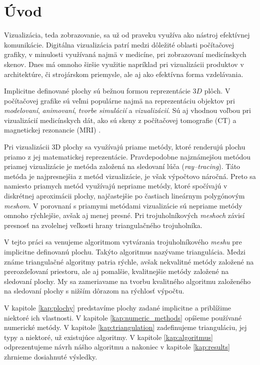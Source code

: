 \chapter*{Úvod} %

Vizualizácia, teda zobrazovanie, sa už od praveku využíva ako nástroj efektívnej komunikácie.
Digitálna vizualizácia patrí medzi dôležité oblasti počítačovej grafiky, 
v minulosti využívaná najmä v medicíne, pri zobrazovaní medicínskych skenov.
Dnes má omnoho širšie využitie napríklad pri vizualizácii produktov v architektúre, 
či strojárskom priemysle, ale aj ako efektívna forma vzdelávania. 

Implicitne definované plochy sú bežnou formou reprezentácie $3D$ plôch. V počítačovej grafike 
sú veľmi populárne najmä na reprezentáciu objektov pri \textit{modelovaní}, \textit{animovaní}, 
\textit{tvorbe simulácií} a \textit{vizualizácií}. Sú aj vhodnou
voľbou pri vizualizácií medicínskych dát, ako sú skeny z počítačovej tomografie (CT) a magnetickej
rezonancie (MRI) \cite{de2015survey}.

Pri vizualizácii 3D plochy sa využívajú priame metódy, ktoré renderujú plochu 
priamo z jej matematickej reprezentácie. Pravdepodobne najznámejšou metódou priamej vizualizácie je 
metóda založená na sledovaní lúča (\textit{ray--tracing}). Táto metóda je najpresnejšia z metód vizualizácie,
je však výpočtovo náročná. Preto sa namiesto priamych metód využívajú nepriame metódy, 
ktoré spočívajú v diskrétnej aproximácii plochy, najčastejšie po častiach lineárnym 
polygónovým \textit{meshom}. V porovnaní s priamymi metódami 
vizualizácie sú nepriame metódy omnoho rýchlejšie, avšak aj menej presné. Pri trojuholníkových 
\textit{meshoch} závisí presnosť na zvolelnej veľkosti hrany triangulačného trojuholníka. 

V tejto práci sa venujeme algoritmom vytvárania trojuholníkového \textit{meshu} pre 
implicitne definovanú plochu. Takýto algoritmus nazývame triangulácia. Medzi známe triangulačné 
algoritmy patria rýchle, avšak nekvalitné metódy založené na prerozdeľovaní priestoru, 
ale aj pomalšie, kvalitnejšie metódy založené na sledovaní plochy.
My sa zameriavame na tvorbu kvalitného algoritmu založeného na sledovaní plochy
s nižším dôrazom na rýchlosť výpočtu.

V kapitole \ref{kap:plochy} predstavíme plochy zadané implicitne a priblížime niektoré ich vlastnosti.
V kapitole \ref{kap:numeric_methods} opíšeme používané numerické metódy.
V kapitole \ref{kap:triangulation} zadefinujeme trianguláciu, jej typy a niektoré, už existujúce algoritmy.
V kapitole \ref{kap:algoritmus} odprezentujeme návrh nášho algoritmu a nakoniec v 
kapitole \ref{kap:results} zhrnieme dosiahnuté výsledky. 


